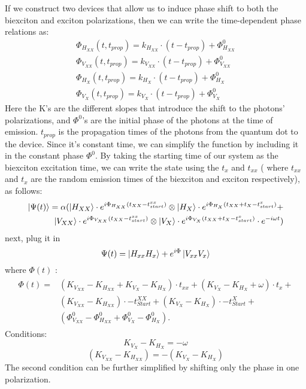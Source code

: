 If we construct two devices that allow us to induce phase shift to both the biexciton and exciton polarizations, then we can write the time-dependent phase relations as: 
\begin{equation}
\begin{aligned} 
		&\Phi_{H_{XX}}{(t,t_{prop})} = k_{H_{XX}}\cdot(t-t_{prop}) + \Phi^0_{H_{XX}} & \\	&\Phi_{V_{XX}}{(t,t_{prop})} = k_{V_{XX}}\cdot(t-t_{prop}) + \Phi^0_{V_{XX}} \\
        &\Phi_{H_{X}}{(t,t_{prop})} = k_{H_{X}}\cdot(t-t_{prop}) + \Phi^0_{H_{X}} &\\
		&\Phi_{V_{X}}{(t,t_{prop})} = k_{V_{X}}\cdot(t-t_{prop}) + \Phi^0_{V_{X}} 
\end{aligned}
\end{equation}
Here the  K's are the different slopes that introduce the shift to the photons' polarizations, and  $\Phi^0$'s are the initial phase of the photons at the time of emission. $t_{prop}$ is the propagation times of the photons from the quantum dot to the device. Since it's constant time, we can simplify the function by including it in the constant phase $\Phi^0$.
By taking the starting time of our system as the biexciton excitation time, we can write the state using the $t_x$ and $t_{xx}$ ( where $t_{xx}$ and $t_{x}$ are the random emission times of the biexciton and exciton respectively), as follows:
\begin{equation}
\begin{split}
		\ket{\Psi(t)}= \alpha(\ket{H_{XX}}\cdot e^{i\Phi_{H_{XX}}(t_{XX}-t^{xx}_{start})} \otimes 
		\ket{H_{X}}\cdot e^{i\Phi_{H_{X}}(t_{XX}+t_{X}-t^{x}_{start})}+\\
        \ket{V_{XX}}\cdot e^{i\Phi_{V_{XX}}(t_{XX}-t^{xx}_{start})} \otimes 
		\ket{V_{X}}\cdot e^{i\Phi_{V_{X}}(t_{XX}+t_{X}-t^{x}_{start})}\cdot e^{-i\omega t})	
  \end{split}
\end{equation} 
next, plug it in
\begin{equation}
	\Psi(t) = \ket{H_{xx}H_x}+e^{i\Phi}\ket{V_{xx}V_x}
\end{equation}
where $\Phi(t)$ :
\begin{equation}
\begin{split}  
\begin{aligned} 
	\Phi(t) = &(K_{V_{XX}}-K_{H_{XX}}+K_{V_X} - K_{H_X})\cdot t_{xx}+(K_{V_X}-K_{H_X} + \omega)\cdot t_x +\\
 &(K_{V_{XX}} - K_{H_{XX}})\cdot-t^{XX}_{Start} +(K_{V_X}-K_{H_X})\cdot-t^X_{Start}+\\
 &(\Phi^0_{V_{XX}}-\Phi^0_{H_{XX}}+\Phi^0_{V_{X}}-\Phi^0_{H_{X}}).
 \end{aligned}
 \end{split}
\end{equation}
Conditions:
\begin{equation}
	K_{V_X}-K_{H_X} = -\omega
\end{equation}
\begin{equation}
	(K_{V_{XX}} -K_{H_{XX}}) = -(K_{V_X}-K_{H_X})
\end{equation}
The second condition can be further simplified by shifting only the phase in one polarization.
